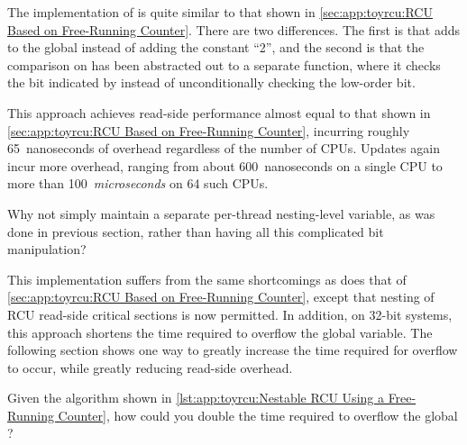 \begin{lineref}
The implementation of  is quite similar to
that shown in
\cref{sec:app:toyrcu:RCU Based on Free-Running Counter}.
There are two differences.
The first is that 
adds  to the global 
instead of adding the constant ``2'',
and the second is that the comparison on 
has been abstracted out to a separate function,
where it checks the bit indicated by 
instead of unconditionally checking the low-order bit.
\end{lineref}

This approach achieves read-side performance almost equal to that
shown in
\cref{sec:app:toyrcu:RCU Based on Free-Running Counter}, incurring
roughly 65~nanoseconds of overhead regardless of the number of
 CPUs.
Updates again incur more overhead, ranging from about 600~nanoseconds on
a single  CPU to more than 100~\emph{microseconds} on 64
such CPUs.

\QuickQuiz{}
	Why not simply maintain a separate per-thread nesting-level
	variable, as was done in previous section, rather than having
	all this complicated bit manipulation?
 \QuickQuizEnd

This implementation suffers from the same shortcomings as does that of
\cref{sec:app:toyrcu:RCU Based on Free-Running Counter}, except that
nesting of RCU read-side critical sections is now permitted.
In addition, on 32-bit systems, this approach shortens the time
required to overflow the global  variable.
The following section shows one way to greatly increase the time
required for overflow to occur, while greatly reducing read-side
overhead.

\QuickQuiz{}
	Given the algorithm shown in
	\cref{lst:app:toyrcu:Nestable RCU Using a Free-Running Counter},
	how could you double the time required to overflow the global
	?
 \QuickQuizEnd

